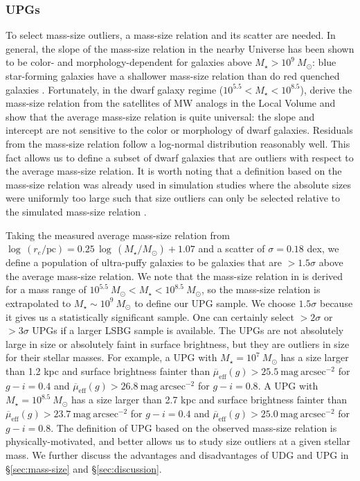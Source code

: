 \documentclass[twocolumn,astrosymb,twocolappendix]{aastex631}
\newcommand{\sbunit}{\mathrm{mag\ arcsec}^{-2}}
\newcommand{\sbeff}{\overline{\mu}_{\mathrm{eff}}(g)}
\begin{document}
\begin{CJK*}{UTF8}{gbsn}
\subsubsection{UPGs}
To select mass-size outliers, a mass-size relation and its scatter are needed. In general, the slope of the mass-size relation in the nearby Universe has been shown to be color- and morphology-dependent for galaxies above $M_\star > 10^{9}\ M_\odot$: blue star-forming galaxies have a shallower mass-size relation than do red quenched galaxies \citep[e.g.,][]{Lange2015}. Fortunately, in the dwarf galaxy regime ($10^{5.5} < M_\star < 10^{8.5}$), \citet{ELVES-I} derive the mass-size relation from the satellites of MW analogs in the Local Volume and show that the average mass-size relation is quite universal: the slope and intercept are not sensitive to the color or morphology of dwarf galaxies. Residuals from the mass-size relation follow a log-normal distribution reasonably well. This fact allows us to define a subset of dwarf galaxies that are outliers with respect to the average mass-size relation. It is worth noting that a definition based on the mass-size relation was already used in simulation studies where the absolute sizes were uniformly too large such that size outliers can only be selected relative to the simulated mass-size relation \citep[e.g.,][]{Benavides2021,Benavides2022}. 

Taking the measured average mass-size relation from \citet{ELVES-I} $\log\, (r_e/\mathrm{pc}) = 0.25\, \log\, (M_\star/M_\odot) + 1.07$ and a scatter of $\sigma=0.18$ dex, we define a population of ultra-puffy galaxies to be galaxies that are $>1.5\sigma$ above the average mass-size relation. We note that the mass-size relation in \citet{ELVES-I} is derived for a mass range of $10^{5.5}\ M_\odot < M_\star < 10^{8.5}\ M_\odot$, so the mass-size relation is extrapolated to $M_\star \sim 10^9\ M_\odot$ to define our UPG sample. We choose $1.5\sigma$ because it gives us a statistically significant sample. One can certainly select $>2\sigma$ or $>3\sigma$ UPGs if a larger LSBG sample is available. The UPGs are not absolutely large in size or absolutely faint in surface brightness, but they are outliers in size for their stellar masses. For example, a UPG with $M_\star = 10^7\ M_\odot$ has a size larger than 1.2 kpc and surface brightness fainter than $\sbeff > 25.5\ \sbunit$ for $g-i=0.4$ and $\sbeff > 26.8\ \sbunit$ for $g-i=0.8$. A UPG with $M_\star = 10^{8.5}\ M_\odot$ has a size larger than 2.7 kpc and surface brightness fainter than $\sbeff > 23.7\ \sbunit$ for $g-i=0.4$ and $\sbeff > 25.0\ \sbunit$ for $g-i=0.8$. The definition of UPG based on the observed mass-size relation is physically-motivated, and better allows us to study size outliers at a given stellar mass. We further discuss the advantages and disadvantages of UDG and UPG in \S\ref{sec:mass-size} and \S\ref{sec:discussion}.


\end{CJK*}
\end{document}
